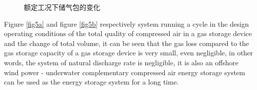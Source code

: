 \documentclass[journal,onecolumn]{IEEEtran}
\begin{document}
\begin{figure}[ht]
	\caption{额定工况下储气包的变化} %
	\label{fig:5}  %
\end{figure}
 
Figure \ref{fig5a} and figure \ref{fig5b} respectively system running a cycle in the design operating conditions of the total quality of compressed air in a gas storage device and the change of total volume,   it can be seen that the gas loss compared to the gas storage capacity of a gas storage device is very small, even negligible, in other words, the system of natural discharge rate is negligible, it is also an offshore wind power - underwater complementary compressed air energy storage system can be used as the energy storage system for a long time.
\end{document}
